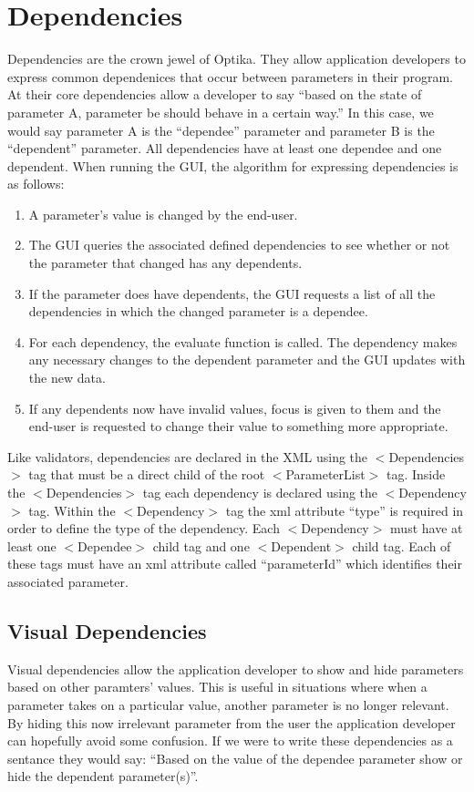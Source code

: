 \section{Dependencies}
Dependencies are the crown jewel of Optika. They allow application developers to express common dependenices that occur between
parameters in their program. At their core dependencies allow a developer to say ``based on the state of parameter A, parameter be should
behave in a certain way.'' In this case, we would say parameter A is the ``dependee'' parameter and parameter B is the ``dependent'' parameter.
All dependencies have at least one dependee and one dependent. When running the GUI, the algorithm for expressing dependencies is as follows:
\begin{enumerate}
	\item A parameter's value is changed by the end-user.
	\item The GUI queries the associated defined dependencies to see whether or not the parameter that changed has any dependents.
	\item If the parameter does have dependents, the GUI requests a list of all the dependencies in which the changed
	parameter is a dependee.
	\item For each dependency, the evaluate function is called. The dependency makes any necessary changes to the dependent parameter
	and the GUI updates with the new data.
	\item If any dependents now have invalid values, focus is given to them and the end-user is requested to change their value to
	something more appropriate.
\end{enumerate}
Like validators, dependencies are declared in the XML using the $<$Dependencies$>$ tag that must be a direct child
of the root $<$ParameterList$>$ tag. Inside the $<$Dependencies$>$ tag each dependency is declared using the $<$Dependency$>$ tag. Within the
$<$Dependency$>$ tag the xml attribute ``type'' is required in order to define the type of the dependency. Each $<$Dependency$>$ must have at least
one $<$Dependee$>$ child tag and one $<$Dependent$>$ child tag. Each of these tags must have an xml attribute called ``parameterId'' which identifies
their associated parameter.

\subsection{Visual Dependencies}
Visual dependencies allow the application developer to show and hide parameters based on other paramters' values. This is useful in situations where
when a parameter takes on a particular value, another parameter is no longer relevant. By hiding this now irrelevant parameter from the user the
application developer can hopefully avoid some confusion. If we were to write these dependencies as a sentance they would say: ``Based on
the value of the dependee parameter show or hide the dependent parameter(s)''.

